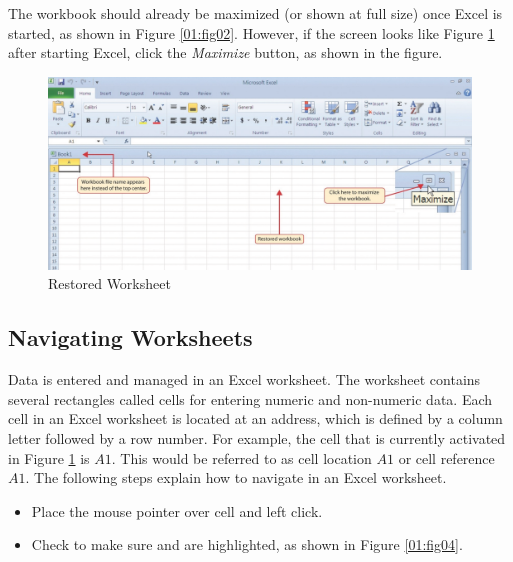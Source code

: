 The workbook should already be maximized (or shown at full size) once Excel is started, as shown in Figure \ref{01:fig02}. However, if the screen looks like Figure \ref{01:fig03} after starting Excel, click the \textit{Maximize} button, as shown in the figure.

\begin{figure}[H]
	\centering
	\includegraphics[width=\maxwidth{.95\linewidth}]{gfx/ch01_fig03}
	\caption{Restored Worksheet}
	\label{01:fig03}
\end{figure}

\subsection{Navigating Worksheets}

Data is entered and managed in an Excel worksheet. The worksheet contains several rectangles called cells for entering numeric and non-numeric data. Each cell in an Excel worksheet is located at an address, which is defined by a column letter followed by a row number. For example, the cell that is currently activated in Figure \ref{01:fig03} is $ A1 $. This would be referred to as cell location $ A1 $ or cell reference $ A1 $. The following steps explain how to navigate in an Excel worksheet.

\begin{itemize}
	\item Place the mouse pointer over cell  and left click.
	\item Check to make sure  and  are highlighted, as shown in Figure \ref{01:fig04}.
\end{itemize}


